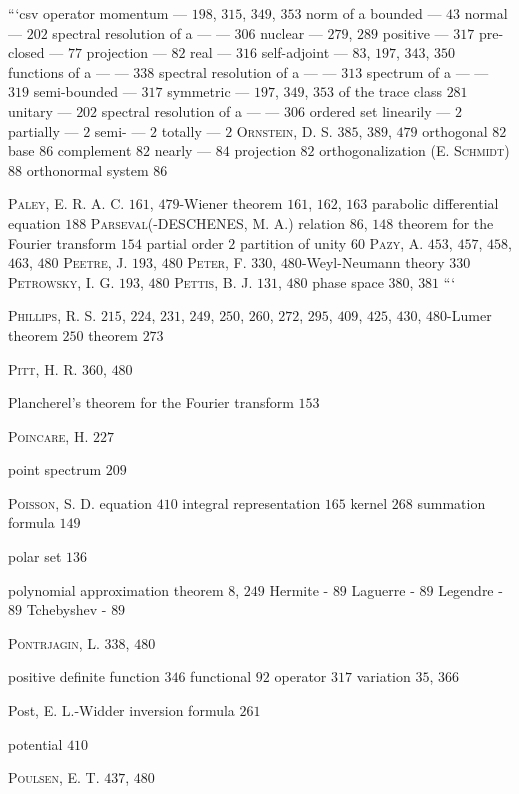 ```csv operator momentum --- $198$, $315$, $349$, $353$ norm of a bounded --- $43$ normal --- $202$ spectral resolution of a --- --- $306$ nuclear --- $279$, $289$ positive --- $317$ pre-closed --- $77$ projection --- $82$ real --- $316$ self-adjoint --- $83$, $197$, $343$, $350$ functions of a --- --- $338$ spectral resolution of a --- --- $313$ spectrum of a --- --- $319$ semi-bounded --- $317$ symmetric --- $197$, $349$, $353$ of the trace class $281$ unitary --- $202$ spectral resolution of a --- --- $306$ ordered set linearily --- $2$ partially --- $2$ semi- --- $2$ totally --- $2$ \textsc{Ornstein}, D. S. $385$, $389$, $479$ orthogonal $82$ base $86$ complement $82$ nearly --- $84$ projection $82$ orthogonalization (E. \textsc{Schmidt}) $88$ orthonormal system $86$

\textsc{Paley}, E. R. A. C. $161$, $479$-Wiener theorem $161$, $162$, $163$ parabolic differential equation $188$ \textsc{Parseval}(-DESCHENES, M. A.) relation $86$, $148$ theorem for the Fourier transform $154$ partial order $2$ partition of unity $60$ \textsc{Pazy}, A. $453$, $457$, $458$, $463$, $480$ \textsc{Peetre}, J. $193$, $480$ \textsc{Peter}, F. $330$, $480$-Weyl-Neumann theory $330$ \textsc{Petrowsky}, I. G. $193$, $480$ \textsc{Pettis}, B. J. $131$, $480$ phase space $380$, $381$ ```

\textsc{Phillips}, R. S. $215$, $224$, $231$, $249$, $250$, $260$, $272$, $295$, $409$, $425$, $430$, $480$-Lumer theorem $250$ theorem $273$

\textsc{Pitt}, H. R. $360$, $480$

Plancherel's theorem for the Fourier transform $153$

\textsc{Poincare}, H. $227$

point spectrum $209$

\textsc{Poisson}, S. D. equation $410$ integral representation $165$ kernel $268$ summation formula $149$

polar set $136$

polynomial approximation theorem $8$, $249$ Hermite - $89$ Laguerre - $89$ Legendre - $89$ Tchebyshev - $89$

\textsc{Pontrjagin}, L. $338$, $480$

positive definite function $346$ functional $92$ operator $317$ variation $35$, $366$

Post, E. L.-Widder inversion formula $261$

potential $410$

\textsc{Poulsen}, E. T. $437$, $480$

